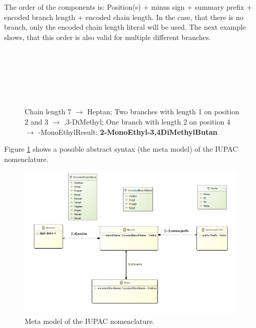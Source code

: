 \documentclass[a4paper,10pt]{article}
\newcommand{\gerquot}[1]{\glqq#1\grqq}
\newcommand{\screenshotWidth}{0.975}
\newcommand{\colorChain}{red}
\newcommand{\colorBranchOne}{green}
\newcommand{\colorBranchTwo}{orange}
\newcommand{\IUPACExample}[1]{\texttt{#1}\\}
\begin{document}
The order of the components is: Position(s) + minus sign + summary prefix + encoded branch length + encoded chain length. In the case, that there is no branch, only the encoded chain length literal will be used. The next example shows, that this order is also valid for multiple different branches.

\begin{figure}[H]
\noindent\IUPACExample
{
    \color{\colorChain}{C - C - C - C - C - C - C}\\
    \phantom{XXXXXXXXXXXXX}\color{\colorBranchTwo}{|}\phantom{XXX}\color{\colorBranchOne}{|}\phantom{XXX}\color{\colorBranchOne}{|}\\
    \phantom{XXXXXXXXXXXXX}\color{\colorBranchTwo}{C}\phantom{XXX}\color{\colorBranchOne}{C}\phantom{XXX}\color{\colorBranchOne}{C}\\
    \phantom{XXXXXXXXXXXXX}\color{\colorBranchTwo}{|}\\
    \phantom{XXXXXXXXXXXXX}\color{\colorBranchTwo}{C}
}
\caption{Chain length 7 $\rightarrow$ \gerquot{Heptan}; Two branches with length 1 on position 2 and 3 $\rightarrow$ \gerquot{2,3-DiMethyl}; One branch with length 2 on position 4 $\rightarrow$ \gerquot{4-MonoEthyl}\space\space\space Result: \textbf{2-MonoEthyl-3,4DiMethylButan}}
\end{figure}

Figure \ref{fig:SSIUPACMetaModel} shows a possible abstract syntax (the meta model) of the IUPAC nomenclature.

\begin{figure}[H]
\centering
\includegraphics[width=\screenshotWidth\textwidth]{./Screenshots/Overview.png}
\caption{Meta model of the IUPAC nomenclature.}
\label{fig:SSIUPACMetaModel}
\end{figure}
\end{document}
